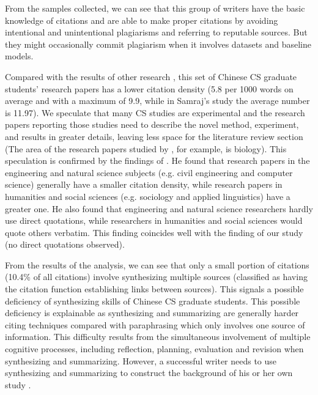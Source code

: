 From the samples collected, we can see that this group of writers have the basic knowledge of citations and are able to make proper citations by avoiding intentional and unintentional plagiarisms and referring to reputable sources. But they might occasionally commit plagiarism when it involves datasets and baseline models.

Compared with the results of other research \citep{fazel_citation_2015,samraj_form_2013,wette_source_2017}, this set of Chinese CS graduate students’ research papers has a lower citation density (5.8 per 1000 words on average and with a maximum of 9.9, while in Samraj’s study the average number is 11.97). We speculate that many CS studies are experimental and the research papers reporting those studies need to describe the novel method, experiment, and results in greater details, leaving less space for the literature review section (The area of the research papers studied by \citet{samraj_form_2013}, for example, is biology). This speculation is confirmed by the findings of \citet{hyland_academic_1999}. He found that research papers in the engineering and natural science subjects (e.g. civil engineering and computer science) generally have a smaller citation density, while research papers in humanities and social sciences (e.g. sociology and applied linguistics) have a greater one. He also found that engineering and natural science researchers hardly use direct quotations, while researchers in humanities and social sciences would quote others verbatim. This finding coincides well with the finding of our study (no direct quotations observed).

From the results of the analysis, we can see that only a small portion of citations (10.4\% of all citations) involve synthesizing multiple sources (classified as having the citation function establishing links between sources). This signals a possible deficiency of synthesizing skills of Chinese CS graduate students. This possible deficiency is explainable as synthesizing and summarizing are generally harder citing techniques compared with paraphrasing which only involves one source of information. This difficulty results from the simultaneous involvement of multiple cognitive processes, including reflection, planning, evaluation and revision \citep{bereiter_psychology_2013,hyland_drawing_2009,kirkland_maximizing_1991,segev-miller_cognitive_2007} when synthesizing and summarizing. However, a successful writer needs to use synthesizing and summarizing to construct the background of his or her own study \citep{swales_genre_1990}.

